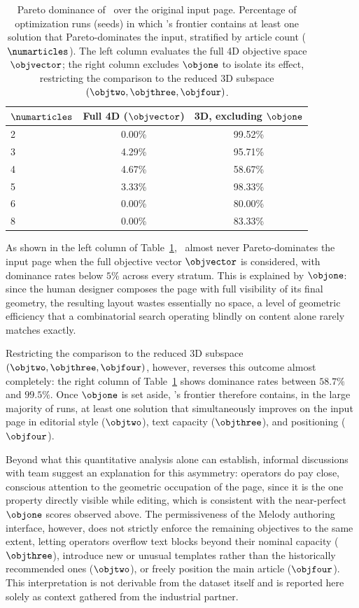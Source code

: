 \begin{table}[htbp]
\centering
\begin{tabular}{lcc}
\toprule
$\numarticles$ & Full 4D ($\objvector$) & 3D, excluding $\objone$  \\
\midrule
2 & 0.00\% & 99.52\% \\
3 & 4.29\% & 95.71\% \\
4 & 4.67\% & 58.67\% \\
5 & 3.33\% & 98.33\% \\
6 & 0.00\% & 80.00\% \\
8 & 0.00\% & 83.33\% \\
\bottomrule
\end{tabular}
\caption{Pareto dominance of \methodName\ over the original input page. Percentage of optimization runs (seeds) in which \methodName's frontier contains at least one solution that Pareto-dominates the input, stratified by article count ($\numarticles$). The left column evaluates the full 4D objective space $\objvector$; the right column excludes $\objone$ to isolate its effect, restricting the comparison to the reduced 3D subspace $(\objtwo,\objthree,\objfour)$.}
\label{tab:input_dominance}
\end{table}

As shown in the left column of Table~\ref{tab:input_dominance}, \methodName\ almost never Pareto-dominates the input page when the full objective vector $\objvector$ is considered, with dominance rates below $5\%$ across every stratum. This is explained by $\objone$: since the human designer composes the page with full visibility of its final geometry, the resulting layout wastes essentially no space, a level of geometric efficiency that a combinatorial search operating blindly on content alone rarely matches exactly.

Restricting the comparison to the reduced 3D subspace $(\objtwo,\objthree,\objfour)$, however, reverses this outcome almost completely: the right column of Table~\ref{tab:input_dominance} shows dominance rates between $58.7\%$ and $99.5\%$. Once $\objone$ is set aside, \methodName's frontier therefore contains, in the large majority of runs, at least one solution that simultaneously improves on the input page in editorial style ($\objtwo$), text capacity ($\objthree$), and positioning ($\objfour$).

Beyond what this quantitative analysis alone can establish, informal discussions with \melody team suggest an explanation for this asymmetry: operators do pay close, conscious attention to the geometric occupation of the page, since it is the one property directly visible while editing, which is consistent with the near-perfect $\objone$ scores observed above. The permissiveness of the Melody authoring interface, however, does not strictly enforce the remaining objectives to the same extent, letting operators overflow text blocks beyond their nominal capacity ($\objthree$), introduce new or unusual templates rather than the historically recommended ones ($\objtwo$), or freely position the main article ($\objfour$). This interpretation is not derivable from the dataset itself and is reported here solely as context gathered from the industrial partner.

